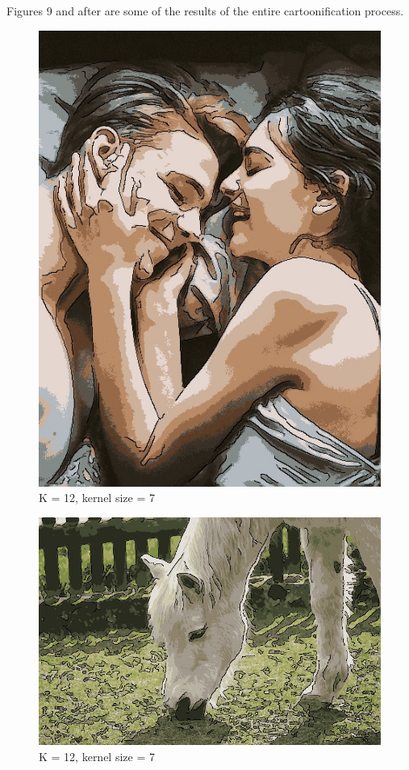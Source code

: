 \documentclass[11pt]{article}
\begin{document}
Figures 9 and after are some of the results of the entire cartoonification process.
\begin{figure}
  \includegraphics[width=\linewidth]{figures/lovers_K=12_ksize=7.jpg}
  \caption{K = 12, kernel size = 7}
\end{figure}

\begin{figure}
  \includegraphics[width=\linewidth]{figures/white_horse_K=12_ksize=7.jpg}
  \caption{K = 12, kernel size = 7}
\end{figure}
\end{document}
